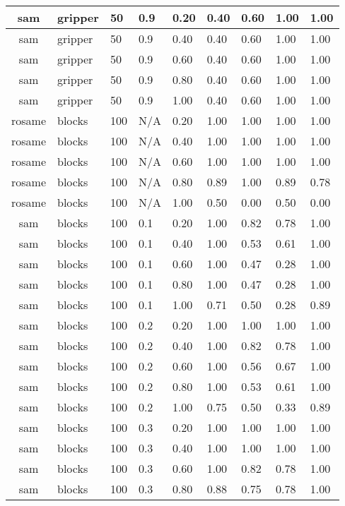 \begin{table}[ht]
\begin{tabular}{c}
sam & gripper & 50 & 0.9 & 0.20 & 0.40 & 0.60 & 1.00 & 1.00 \\ \hline
sam & gripper & 50 & 0.9 & 0.40 & 0.40 & 0.60 & 1.00 & 1.00 \\ \hline
sam & gripper & 50 & 0.9 & 0.60 & 0.40 & 0.60 & 1.00 & 1.00 \\ \hline
sam & gripper & 50 & 0.9 & 0.80 & 0.40 & 0.60 & 1.00 & 1.00 \\ \hline
sam & gripper & 50 & 0.9 & 1.00 & 0.40 & 0.60 & 1.00 & 1.00 \\ \hline
rosame & blocks & 100 & N/A & 0.20 & 1.00 & 1.00 & 1.00 & 1.00 \\ \hline
rosame & blocks & 100 & N/A & 0.40 & 1.00 & 1.00 & 1.00 & 1.00 \\ \hline
rosame & blocks & 100 & N/A & 0.60 & 1.00 & 1.00 & 1.00 & 1.00 \\ \hline
rosame & blocks & 100 & N/A & 0.80 & 0.89 & 1.00 & 0.89 & 0.78 \\ \hline
rosame & blocks & 100 & N/A & 1.00 & 0.50 & 0.00 & 0.50 & 0.00 \\ \hline
sam & blocks & 100 & 0.1 & 0.20 & 1.00 & 0.82 & 0.78 & 1.00 \\ \hline
sam & blocks & 100 & 0.1 & 0.40 & 1.00 & 0.53 & 0.61 & 1.00 \\ \hline
sam & blocks & 100 & 0.1 & 0.60 & 1.00 & 0.47 & 0.28 & 1.00 \\ \hline
sam & blocks & 100 & 0.1 & 0.80 & 1.00 & 0.47 & 0.28 & 1.00 \\ \hline
sam & blocks & 100 & 0.1 & 1.00 & 0.71 & 0.50 & 0.28 & 0.89 \\ \hline
sam & blocks & 100 & 0.2 & 0.20 & 1.00 & 1.00 & 1.00 & 1.00 \\ \hline
sam & blocks & 100 & 0.2 & 0.40 & 1.00 & 0.82 & 0.78 & 1.00 \\ \hline
sam & blocks & 100 & 0.2 & 0.60 & 1.00 & 0.56 & 0.67 & 1.00 \\ \hline
sam & blocks & 100 & 0.2 & 0.80 & 1.00 & 0.53 & 0.61 & 1.00 \\ \hline
sam & blocks & 100 & 0.2 & 1.00 & 0.75 & 0.50 & 0.33 & 0.89 \\ \hline
sam & blocks & 100 & 0.3 & 0.20 & 1.00 & 1.00 & 1.00 & 1.00 \\ \hline
sam & blocks & 100 & 0.3 & 0.40 & 1.00 & 1.00 & 1.00 & 1.00 \\ \hline
sam & blocks & 100 & 0.3 & 0.60 & 1.00 & 0.82 & 0.78 & 1.00 \\ \hline
sam & blocks & 100 & 0.3 & 0.80 & 0.88 & 0.75 & 0.78 & 1.00 \\ \hline

\end{tabular}
\end{table}
